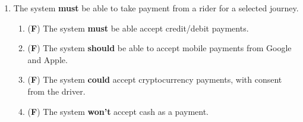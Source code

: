 \documentclass{article}
\begin{document}
\begin{enumerate}
      \newpage
      \item The system \textbf{must} be able to take payment from a rider for a selected journey.
      \begin{enumerate}[label=2.\arabic*]
        \item (\textbf{F}) The system \textbf{must} be able accept credit/debit payments.
        \item (\textbf{F}) The system \textbf{should} be able to accept mobile payments from Google and Apple.
        \item (\textbf{F}) The system \textbf{could} accept cryptocurrency payments, with consent from the driver.
        \item (\textbf{F}) The system \textbf{won't} accept cash as a payment.
      \end{enumerate}


\end{enumerate}
\end{document}
